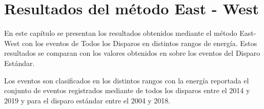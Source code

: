 
\chapter{Resultados del método East - West}

En este capítulo se presentan los resultados obtenidos mediante el método East-West con los eventos de Todos los Disparos en distintos rangos de energía. Estos resultados se comparan con los valores obtenidos en \cite{Aab_2020} sobre los eventos  del Disparo Estándar. 

Los eventos son clasificados en los distintos rangos con la energía reportada el conjunto de eventos registrados mediante de todos los disparos  entre el 2014 y 2019 y para el disparo estándar entre el 2004 y 2018.

